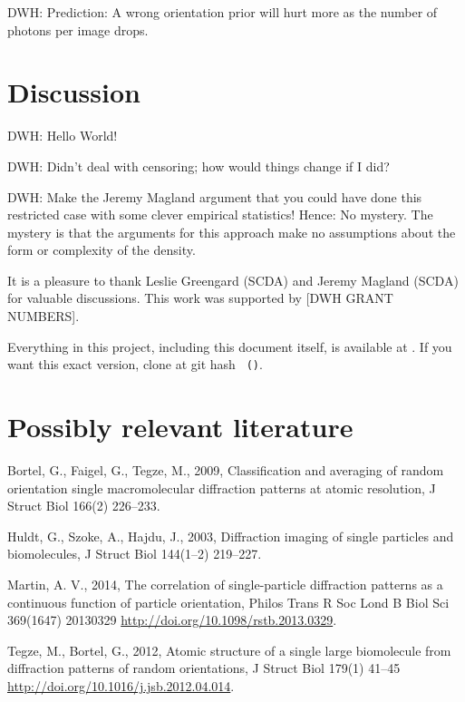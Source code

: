 \documentclass[12pt]{article}
\newcommand{\doi}[1]{{\footnotesize \url{http://doi.org/#1}}}
\begin{document}
DWH: Prediction: A wrong orientation prior will hurt more as the
number of photons per image drops.

\section{Discussion}

DWH: Hello World!

DWH: Didn't deal with censoring; how would things change if I did?

DWH: Make the Jeremy Magland argument that you could have done this
restricted case with some clever empirical statistics!  Hence: No
mystery.  The mystery is that the arguments for this approach make no
assumptions about the form or complexity of the density.

\bigskip

It is a pleasure to thank Leslie Greengard (SCDA) and Jeremy Magland
(SCDA) for valuable discussions.
This work was supported by [DWH GRANT NUMBERS].

Everything in this project, including this document itself, is
available at \giturl.  If you want this exact version, clone at git
hash \texttt{\githash\,(\gitdate)}.

\section*{Possibly relevant literature}\raggedright
\begin{trivlist}
\item
Bortel, G., Faigel, G., Tegze, M., 2009,
Classification and averaging of random orientation single macromolecular diffraction patterns at atomic resolution,
J Struct Biol 166(2) 226--233.
\item
Huldt, G., Szoke, A., Hajdu, J., 2003,
Diffraction imaging of single particles and biomolecules,
J Struct Biol 144(1--2) 219--227.
\item
Martin, A. V., 2014,
The correlation of single-particle diffraction patterns as a continuous function of particle orientation,
Philos Trans R Soc Lond B Biol Sci 369(1647) 20130329
\doi{10.1098/rstb.2013.0329}.
\item
Tegze, M., Bortel, G., 2012,
Atomic structure of a single large biomolecule from diffraction patterns of random orientations,
J Struct Biol 179(1) 41--45
\doi{10.1016/j.jsb.2012.04.014}.
\end{trivlist}
\end{document}
